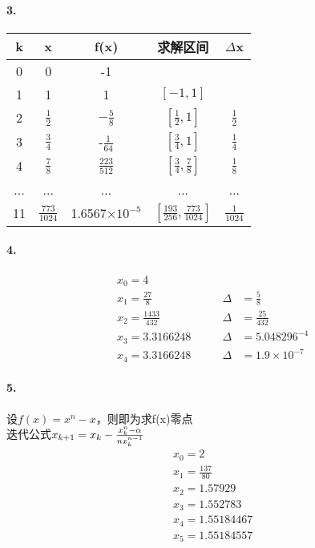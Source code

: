 \documentclass[UTF8]{ctexart}
\begin{document}
	\paragraph{3.}
	\begin{table}[h]
		\centering
		\begin{tabular}{|c|c|c|c|c|}\hline
			k&x&f(x)&求解区间&$\Delta$x\\\hline
			0&0&-1&&\\
			1&1&1&$[-1,1]$&\\
			2&$\frac{1}{2}$&$-\frac{5}{8}$&$[\frac{1}{2},1]$&$\frac{1}{2}$\\
			3&$\frac{3}{4}$&-$\frac{1}{64}$&$[\frac{3}{4},1]$&$\frac{1}{4}$\\
			4&$\frac{7}{8}$&$\frac{223}{512}$&$[\frac{3}{4},\frac{7}{8}]$&$\frac{1}{8}$\\
			...&...&...&...&...\\
			11&$\frac{773}{1024}$&1.6567$\times10^{-5}$&$[\frac{193}{256},\frac{773}{1024}]$&$\frac{1}{1024}$\\\hline
		\end{tabular}
	\end{table}

	\paragraph{4.}
	\begin{displaymath}
	\begin{aligned}
		&x_0=4&&\\
		&x_1=\frac{27}{8}\qquad&\Delta&=\frac{5}{8}\\
		&x_2=\frac{1433}{432}\qquad&\Delta&=\frac{25}{432}\\
		&x_3=3.3166248\qquad&\Delta&=5.048296^{-4}\\
		&x_4=3.3166248\qquad&\Delta&=1.9\times 10^{-7}
	\end{aligned}
	\end{displaymath}

	\paragraph{5.}
	设$f(x)=x^n-x$，则即为求f(x)零点\\
	迭代公式$x_{k+1}=x_k-\frac{x_k^n-\alpha}{nx_k^{n-1}}\\$
	\begin{displaymath}
	\begin{aligned}
		&x_0=2\\
		&x_1=\frac{137}{80}\\
		&x_2=1.57929\\
		&x_3=1.552783\\
		&x_4=1.55184467\\
		&x_5=1.55184557
	\end{aligned}
	\end{displaymath}
\end{document}

